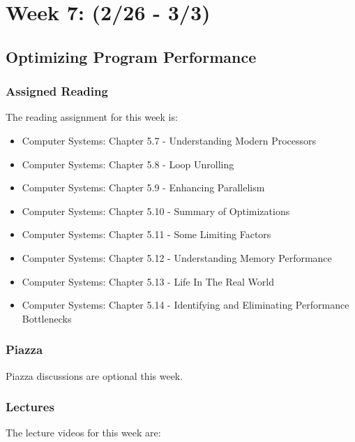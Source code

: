 \clearpage

\renewcommand{\ChapTitle}{Week 7: (2/26 - 3/3)}
\renewcommand{\SectionTitle}{Optimizing Program Performance}

\chapter{\ChapTitle}

\section{\SectionTitle}

\subsection{Assigned Reading}

The reading assignment for this week is:

\begin{itemize}
    \item Computer Systems: Chapter 5.7 - Understanding Modern Processors
    \item Computer Systems: Chapter 5.8 - Loop Unrolling
    \item Computer Systems: Chapter 5.9 - Enhancing Parallelism
    \item Computer Systems: Chapter 5.10 - Summary of Optimizations
    \item Computer Systems: Chapter 5.11 - Some Limiting Factors
    \item Computer Systems: Chapter 5.12 - Understanding Memory Performance
    \item Computer Systems: Chapter 5.13 - Life In The Real World
    \item Computer Systems: Chapter 5.14 - Identifying and Eliminating Performance Bottlenecks
\end{itemize}

\subsection{Piazza}

Piazza discussions are optional this week. 

\subsection{Lectures}

The lecture videos for this week are:

